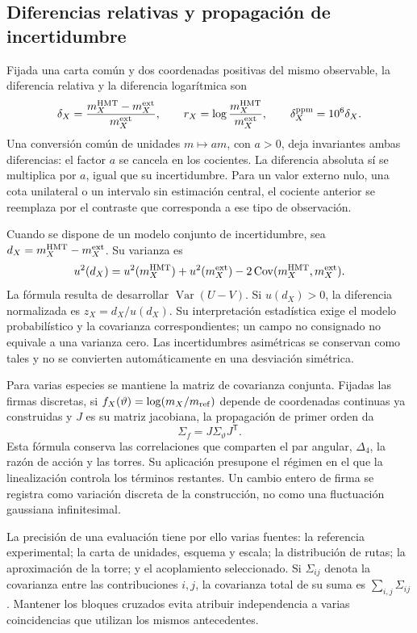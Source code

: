 \subsection{Diferencias relativas y propagación de incertidumbre}
\label{subsec:vi-residuales}

Fijada una carta común y dos coordenadas positivas del mismo observable,
la diferencia relativa y la diferencia logarítmica son
\[
 \delta_X=\frac{m_X^{\rm HMT}-m_X^{\rm ext}}{m_X^{\rm ext}},
 \qquad r_X=\log\frac{m_X^{\rm HMT}}{m_X^{\rm ext}},
 \qquad \delta_X^{\rm ppm}=10^6\delta_X.
\]
Una conversión común de unidades \(m\mapsto am\), con \(a>0\),
deja invariantes ambas diferencias: el factor \(a\) se cancela en los
cocientes. La diferencia absoluta sí se multiplica por \(a\), igual que
su incertidumbre. Para un valor externo nulo, una cota unilateral o un
intervalo sin estimación central, el cociente anterior se reemplaza por
el contraste que corresponda a ese tipo de observación.

Cuando se dispone de un modelo conjunto de incertidumbre, sea
\(d_X=m_X^{\rm HMT}-m_X^{\rm ext}\). Su varianza es
\[
 u^2(d_X)=u^2(m_X^{\rm HMT})+u^2(m_X^{\rm ext})
          -2\operatorname{Cov}(m_X^{\rm HMT},m_X^{\rm ext}).
\]
La fórmula resulta de desarrollar
\(\operatorname{Var}(U-V)\). Si \(u(d_X)>0\), la diferencia
normalizada es \(z_X=d_X/u(d_X)\). Su interpretación estadística exige
el modelo probabilístico y la covarianza correspondientes; un campo no
consignado no equivale a una varianza cero. Las incertidumbres asimétricas
se conservan como tales y no se convierten automáticamente en una desviación
simétrica.

Para varias especies se mantiene la matriz de covarianza conjunta. Fijadas
las firmas discretas, si \(f_X(\vartheta)=\log(m_X/m_{\rm ref})\)
depende de coordenadas continuas ya construidas y \(J\) es su matriz
jacobiana, la propagación de primer orden da
\[
 \Sigma_f=J\Sigma_\vartheta J^{\mathsf T}.
\]
Esta fórmula conserva las correlaciones que comparten el par angular,
\(\Delta_4\), la razón de acción y las torres. Su aplicación presupone
el régimen en el que la linealización controla los términos restantes.
Un cambio entero de firma se registra como variación discreta de la
construcción, no como una fluctuación gaussiana infinitesimal.

La precisión de una evaluación tiene por ello varias fuentes: la
referencia experimental; la carta de unidades, esquema y escala; la
distribución de rutas; la aproximación de la torre; y el acoplamiento
seleccionado. Si \(\Sigma_{ij}\) denota la covarianza entre las
contribuciones \(i,j\), la covarianza total de su suma es
\(\sum_{i,j}\Sigma_{ij}\). Mantener los bloques cruzados evita
atribuir independencia a varias coincidencias que utilizan los mismos
antecedentes.

